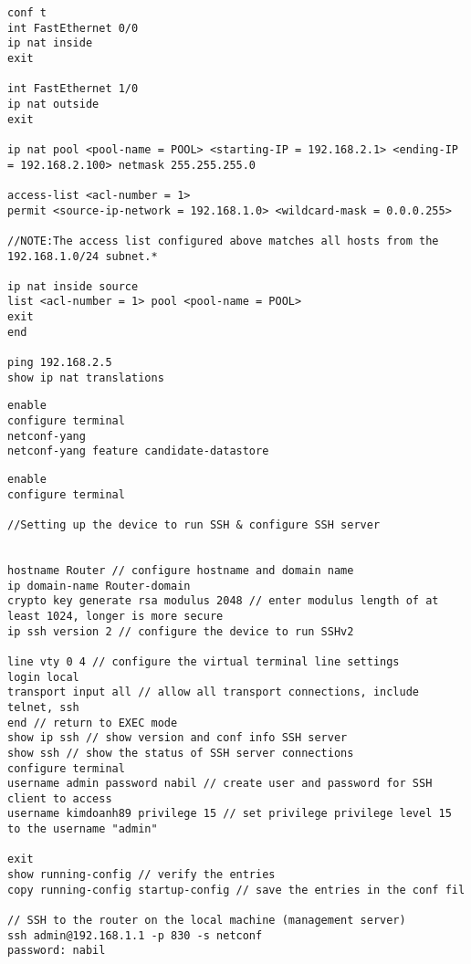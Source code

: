 \begin{lstlisting}[style=cliStyle, caption={Configure NAT.},  backgroundcolor=\color{codebackground}]
conf t
int FastEthernet 0/0
ip nat inside
exit

int FastEthernet 1/0
ip nat outside
exit

ip nat pool <pool-name = POOL> <starting-IP = 192.168.2.1> <ending-IP = 192.168.2.100> netmask 255.255.255.0 

access-list <acl-number = 1>
permit <source-ip-network = 192.168.1.0> <wildcard-mask = 0.0.0.255>

//NOTE:The access list configured above matches all hosts from the 192.168.1.0/24 subnet.*

ip nat inside source
list <acl-number = 1> pool <pool-name = POOL>
exit
end 

ping 192.168.2.5
show ip nat translations
\end{lstlisting}
\begin{lstlisting}[style=cliStyle, caption={Configure NETCONF.},  backgroundcolor=\color{codebackground}]
enable
configure terminal
netconf-yang
netconf-yang feature candidate-datastore
\end{lstlisting}

\begin{lstlisting}[style=cliStyle, caption={Configure SSH.},  backgroundcolor=\color{codebackground}]
enable
configure terminal

//Setting up the device to run SSH & configure SSH server


hostname Router // configure hostname and domain name
ip domain-name Router-domain
crypto key generate rsa modulus 2048 // enter modulus length of at least 1024, longer is more secure
ip ssh version 2 // configure the device to run SSHv2

line vty 0 4 // configure the virtual terminal line settings
login local
transport input all // allow all transport connections, include telnet, ssh
end // return to EXEC mode
show ip ssh // show version and conf info SSH server
show ssh // show the status of SSH server connections
configure terminal
username admin password nabil // create user and password for SSH client to access
username kimdoanh89 privilege 15 // set privilege privilege level 15 to the username "admin"

exit
show running-config // verify the entries
copy running-config startup-config // save the entries in the conf fil

// SSH to the router on the local machine (management server)
ssh admin@192.168.1.1 -p 830 -s netconf
password: nabil
\end{lstlisting}